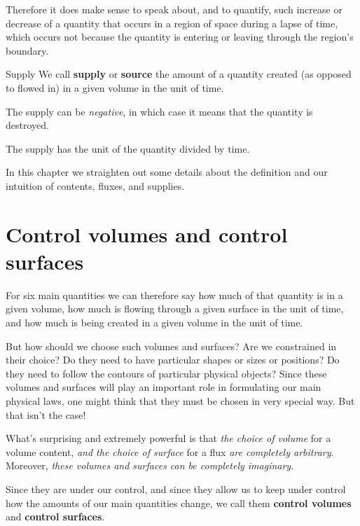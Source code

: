 \documentclass[a4paper,12pt,%
onecolumn,oneside,%
british%
]{memoir}
\renewcommand*{\|}[1][]{\nonscript\:#1\vert\nonscript\:\mathopen{}}
\begin{document}
Therefore it does make sense to speak about, and to quantify, such increase or decrease of a quantity that occurs in a region of space during a lapse of time, which occurs not because the quantity is entering or leaving through the region's boundary. %
\begin{definition}{Supply}
  We call \textbf{supply} or \textbf{source} the amount of a quantity created (as opposed to flowed in) in a given volume in the unit of time.

  The supply can be \emph{negative}, in which case it means that the quantity is destroyed.

  The supply has the unit of the quantity divided by time.
\end{definition}

\medskip

In this chapter we straighten out some details about the definition and our intuition of contents, fluxes, and supplies.




\section{Control volumes and control surfaces}
\label{sec_controlvolumes_surfaces}

For six main quantities we can therefore say how much of that quantity is in a given volume, how much is flowing through a given surface in the unit of time, and how much is being created in a given volume in the unit of time.

But how should we choose such volumes and surfaces? Are we constrained in their choice? Do they need to have particular shapes or sizes or positions? Do they need to follow the contours of particular physical objects? Since these volumes and surfaces will play an important role in formulating our main physical laws, one might think that they must be chosen in very special way. But that isn't the case!

What's surprising and extremely powerful is that \emph{the choice of volume} for a volume content, \emph{and the choice of surface} for a flux \emph{are completely arbitrary}. Moreover, \emph{these volumes and surfaces can be completely imaginary}.

Since they are under our control, and since they allow us to keep under control how the amounts of our main quantities change, we call them \textbf{control volumes} and \textbf{control surfaces}.
\end{document}
